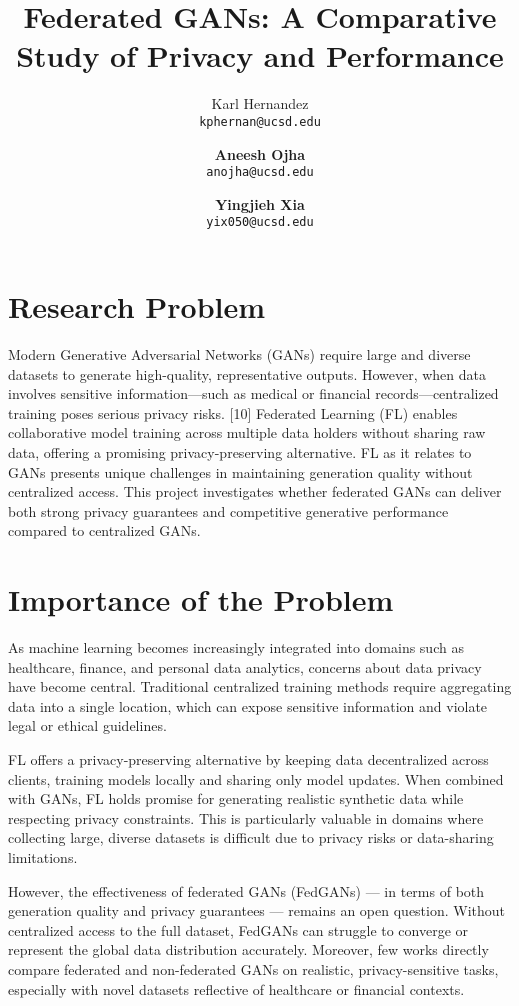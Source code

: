 \documentclass{article}
\title{Federated GANs: A Comparative Study of Privacy and Performance}
\author{%
  Karl Hernandez\\
  \texttt{kphernan@ucsd.edu}\\
  \and
  \textbf{Aneesh Ojha}\\
  \texttt{anojha@ucsd.edu}\\
  \and
  \textbf{Yingjieh Xia}\\
  \texttt{yix050@ucsd.edu}\\
}
\begin{document}
\maketitle
\vspace{-2em}
\section{Research Problem}

Modern Generative Adversarial Networks (GANs) require large and diverse datasets to generate high-quality, representative outputs. However, when data involves sensitive information—such as medical or financial records—centralized training poses serious privacy risks. [10]  Federated Learning (FL) enables collaborative model training across multiple data holders without sharing raw data, offering a promising privacy-preserving alternative. FL as it relates to GANs presents unique challenges in maintaining generation quality without centralized access. This project investigates whether federated GANs can deliver both strong privacy guarantees and competitive generative performance compared to centralized GANs.

\section{Importance of the Problem}
As machine learning becomes increasingly integrated into domains such as healthcare, finance, and personal data analytics, concerns about data privacy have become central. Traditional centralized training methods require aggregating data into a single location, which can expose sensitive information and violate legal or ethical guidelines.

FL offers a privacy-preserving alternative by keeping data decentralized across clients, training models locally and sharing only model updates. When combined with GANs, FL holds promise for generating realistic synthetic data while respecting privacy constraints. This is particularly valuable in domains where collecting large, diverse datasets is difficult due to privacy risks or data-sharing limitations.

However, the effectiveness of federated GANs (FedGANs) — in terms of both generation quality and privacy guarantees — remains an open question. Without centralized access to the full dataset, FedGANs can struggle to converge or represent the global data distribution accurately. Moreover, few works directly compare federated and non-federated GANs on realistic, privacy-sensitive tasks, especially with novel datasets reflective of healthcare or financial contexts.
\end{document}
